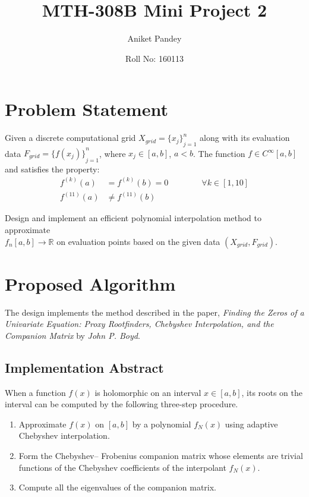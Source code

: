 \documentclass[12pt]{article}
\title{\vspace{-70pt}MTH-308B Mini Project 2}
\author{Aniket Pandey}
\date{Roll No: 160113}
\begin{document}
\maketitle

\section*{Problem Statement}
Given a discrete computational grid $X_{grid} = {\{x_j\}}^n_{j=1}$ along with its evaluation data
$F_{grid} = {\{f(x_j)\}}^n_{j=1}$, where $x_j \in [a, b]$, $a < b$. The function $f \in C^{\infty}[a,b]$
and satisfies the property:
    \begin{align}
	f^{(k)}(a) & = f^{(k)}(b) = 0 \qquad \qquad \forall k \in [1, 10] \\
	f^{(11)}(a) & \neq f^{(11)}(b)
    \end{align}
    
Design and implement an efficient polynomial interpolation method to approximate \\
$f_n[a,b] \rightarrow \mathbb{R}$ on evaluation points based on the given data $(X_{grid}, F_{grid})$.

\section*{Proposed Algorithm}
The design implements the method described in the paper, \textit{Finding the Zeros of a Univariate Equation: Proxy Rootfinders, Chebyshev Interpolation, and the Companion Matrix} by \textit{John P. Boyd}.

\subsection*{Implementation Abstract}
When a function $f(x)$ is holomorphic on an interval $x \in [a, b]$, its roots on the interval can be computed
by the following three-step procedure.

\begin{enumerate}
	\item Approximate $f(x)$ on $[a, b]$ by a polynomial $f_N(x)$ using adaptive Chebyshev interpolation.
	\item Form the Chebyshev– Frobenius companion matrix whose elements are trivial functions of the
	Chebyshev coefficients of the interpolant $f_N(x)$.
	\item Compute all the eigenvalues of the companion matrix.
\end{enumerate}
\end{document}
